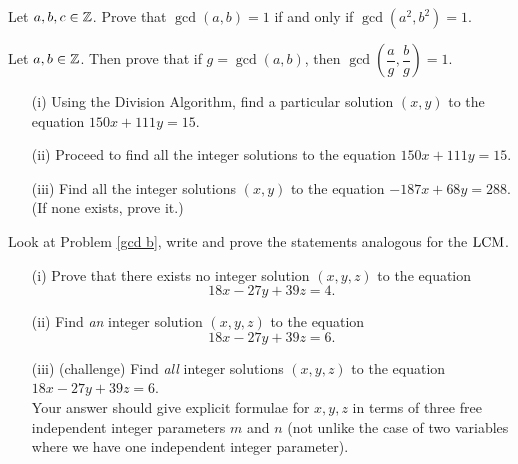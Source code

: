 \begin{problem}\label{problem 2.2}
Let $a,b,c \in \mathbb Z$. Prove that $\gcd(a,b) = 1$ if and only if $\gcd(a^2,b^2) = 1$.
\end{problem}

\vspace*{0.1in}

\begin{problem}\label{problem 2.3}
Let $a,b \in \mathbb Z$. Then prove that if $g = \gcd(a,b)$, then $\gcd\left(\dfrac{a}{g},\dfrac{b}{g}\right) = 1$.
\end{problem}

\vspace*{0.1in}

\begin{problem}\label{problem 2.4}\hfill
\begin{itemize}
\item[(i)] Using the Division Algorithm, find a particular solution $(x,y)$ to the equation $150x + 111y = 15$.
\item[(ii)] Proceed to find all the integer solutions to the equation  $150x + 111y = 15$.
\item[(iii)] Find all the integer solutions $(x, y)$ to the equation $-187x + 68y = 288$. (If none exists, prove it.)
\end{itemize}
\end{problem}

\vspace*{0.1in}

\begin{problem}\label{problem 2.5}
Look at Problem \ref{gcd b}, write and prove the statements analogous for the $\operatorname{LCM}$. 
\end{problem}

\vspace*{0.1in}

\begin{problem}\label{problem 2.6}\hfill
\begin{itemize}
\item[(i)] Prove that there exists no integer solution $(x, y, z)$ to the equation
\[18x - 27y + 39z = 4.\]
\item[(ii)] Find \emph{an} integer solution $(x, y, z)$ to the equation \[18x - 27y + 39z = 6.\]
\item[(iii)] (challenge) Find \emph{all} integer solutions $(x, y, z)$ to the equation $18x - 27y + 39z = 6$.\\[0.5em]
Your answer should give explicit formulae for $x, y, z$ in terms of three free independent integer parameters $m$ and $n$ (not unlike the case of two variables where we have one independent integer parameter).
\end{itemize}
\end{problem}

